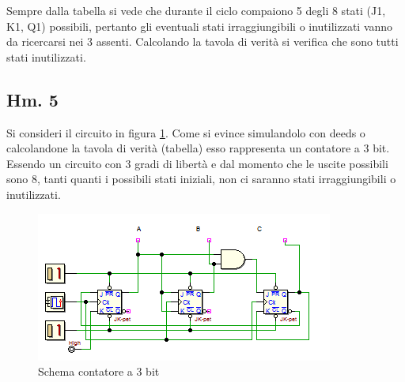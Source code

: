 \documentclass[journal, a4paper]{IEEEtran}
\begin{document}
Sempre dalla tabella si vede che durante il ciclo compaiono 5 degli 8 stati (J1, K1, Q1) possibili, pertanto gli eventuali stati irraggiungibili o inutilizzati vanno da ricercarsi nei 3 assenti. Calcolando la tavola di verità si verifica che sono tutti stati inutilizzati.

\subsection{Hm. 5}

Si consideri il circuito in figura \ref{fig:count3}. Come si evince simulandolo con deeds o calcolandone la tavola di verità (tabella) esso rappresenta un contatore a 3 bit. Essendo un circuito con 3 gradi di libertà e dal momento che le uscite possibili sono 8, tanti quanti i possibili stati iniziali, non ci saranno stati irraggiungibili o inutilizzati.

\begin{figure}[htp]
\centering
\includegraphics[scale=.8]{hm5}
\caption{Schema contatore a 3 bit}
\label{fig:count3}
\end{figure}
\end{document}
